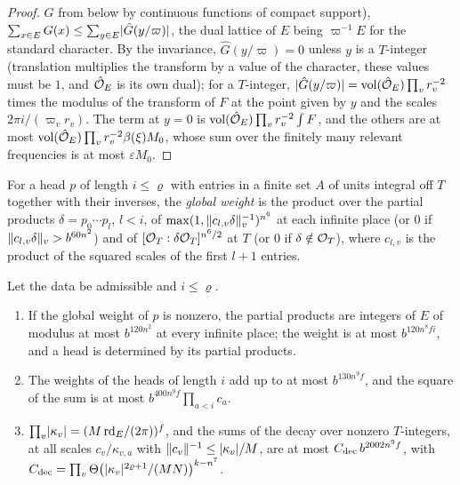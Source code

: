 \begin{proof}
$G$ from below by continuous functions of compact support), $\sum_{x\in E}G(x)\le\sum_{y\in E}\lvert \hat G(y/\varpi)\rvert$, the dual lattice of $E$ being $\varpi^{-1}E$ for the standard character. By the invariance, $\hat G(y/\varpi)=0$ unless $y$ is a
$T$-integer (translation multiplies the transform by a value of the character, these values must be $1$, and $\hat{\mathcal{O}}_E$ is its own dual); for a $T$-integer, $\lvert \hat G(y/\varpi)\rvert=\operatorname{vol}(\hat{\mathcal{O}}_E)\prod_vr_v^{-2}$ times the modulus of the
transform of $F$ at the point given by $y$ and the scales $2\pi i/(\varpi_vr_v)$. The term at $y=0$ is $\operatorname{vol}(\hat{\mathcal{O}}_E)\prod_vr_v^{-2}\int F$, and the others are at most $\operatorname{vol}(\hat{\mathcal{O}}_E)\prod_vr_v^{-2}\beta(\xi)M_0$, whose sum over the finitely many
relevant frequencies is at most $\varepsilon M_0$.
\end{proof}

For a head $p$ of length $i\le\varrho$ with entries in a finite set $A$ of units integral off $T$ together with their inverses, the \emph{global weight} is the product over the partial products $\delta=p_0\cdots p_l$, $l<i$, of
$\max(1,\lVert c_{l,v}\delta\rVert_v^{-1})^{n^6}$ at each infinite place (or $0$ if $\lVert c_{l,v}\delta\rVert_v>b^{60n^2}$) and of $[\mathcal{O}_T:\delta\mathcal{O}_T]^{n^6/2}$ at $T$ (or $0$ if $\delta\notin\mathcal{O}_T$), where $c_{l,v}$ is the product of the squared scales of the
first $l+1$ entries.

\begin{lemma}\label{lem:sieve-weights}
Let the data be admissible and $i\le\varrho$.
\begin{enumerate}[label=\textup{(\alph*)}]
\item If the global weight of $p$ is nonzero, the partial products are integers of $E$ of modulus at most $b^{120n^2}$ at every infinite place; the weight is at most $b^{120n^8fi}$, and a head is determined by its partial
products.
\item The weights of the heads of length $i$ add up to at most $b^{130n^9f}$, and the square of the sum is at most $b^{400n^9f}\prod_{a<i}c_a$.
\item $\prod_v\lvert \kappa_v\rvert=(M\,\mathrm{rd}_E/(2\pi))^f$, and the sums of the decay over nonzero $T$-integers, at all scales $c_v/\kappa_{v,a}$ with $\lVert c_v\rVert^{-1}\le\lvert \kappa_v\rvert/M$, are at most $C_{\rm dec}\,b^{2002n^9f}$, with
$C_{\rm dec}=\prod_v\Theta\bigl(\lvert \kappa_v\rvert^{2\varrho+1}/(MN)\bigr)^{k-n^7}$.
\end{enumerate}
\end{lemma}

